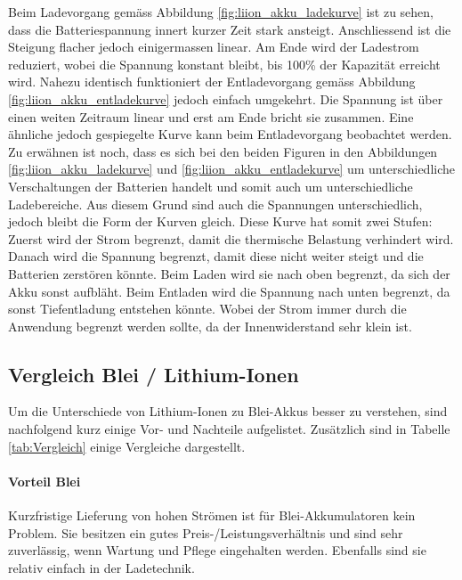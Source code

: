 Beim Ladevorgang gemäss Abbildung \ref{fig:liion_akku_ladekurve} ist zu sehen, dass die Batteriespannung innert kurzer Zeit stark ansteigt. Anschliessend ist die Steigung flacher jedoch einigermassen linear. Am Ende wird der Ladestrom reduziert, wobei die Spannung konstant bleibt, bis 100\% der Kapazität erreicht wird.
Nahezu identisch funktioniert der Entladevorgang gemäss Abbildung \ref{fig:liion_akku_entladekurve} jedoch einfach umgekehrt. Die Spannung ist über einen weiten Zeitraum linear und erst am Ende bricht sie zusammen. Eine ähnliche jedoch gespiegelte Kurve kann beim Entladevorgang beobachtet werden.
Zu erwähnen ist noch, dass es sich bei den beiden Figuren in den Abbildungen \ref{fig:liion_akku_ladekurve} und \ref{fig:liion_akku_entladekurve} um unterschiedliche Verschaltungen der Batterien handelt und somit auch um unterschiedliche Ladebereiche. Aus diesem Grund sind auch die Spannungen unterschiedlich, jedoch bleibt die Form der Kurven gleich. Diese Kurve hat somit zwei Stufen: Zuerst wird der Strom begrenzt, damit die thermische Belastung verhindert wird. Danach wird die Spannung begrenzt, damit diese nicht weiter steigt und die Batterien zerstören könnte. Beim Laden wird sie nach oben begrenzt, da sich der Akku sonst aufbläht. Beim Entladen wird die Spannung nach unten begrenzt, da sonst Tiefentladung entstehen könnte. Wobei der Strom immer durch die Anwendung begrenzt werden sollte, da der Innenwiderstand sehr klein ist.

\newpage

\subsection{Vergleich Blei / Lithium-Ionen} \label{kap:Vergleich_liion_pb}

Um die Unterschiede von Lithium-Ionen zu Blei-Akkus besser zu verstehen, sind nachfolgend kurz einige Vor- und Nachteile aufgelistet. Zusätzlich sind in Tabelle \ref{tab:Vergleich} einige Vergleiche dargestellt.

\paragraph{Vorteil Blei}

Kurzfristige Lieferung von hohen Strömen ist für Blei-Akkumulatoren kein Problem. Sie besitzen ein gutes Preis-/Leistungsverhältnis und sind sehr zuverlässig, wenn Wartung und Pflege eingehalten werden. Ebenfalls sind sie relativ einfach in der Ladetechnik.

